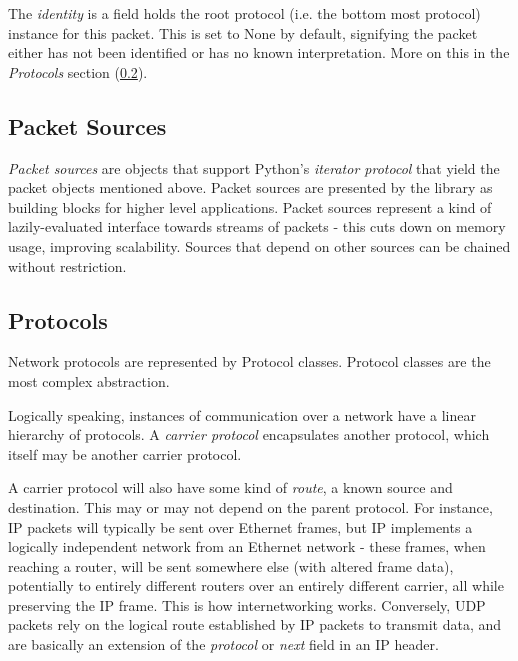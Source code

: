 \documentclass[10pt,a4paper,notitlepage]{report}
\begin{document}
The \emph{identity} is a field holds the root protocol (i.e. the bottom most protocol) instance for this packet. This is set to None by default, signifying the packet either has not been identified or has no known interpretation. More on this in the \emph{Protocols} section (\ref{sec:desproto}).

\subsection{Packet Sources}
\emph{Packet sources} are objects that support Python's \emph{iterator protocol} that yield the packet objects mentioned above. Packet sources are presented by the library as building blocks for higher level applications.
Packet sources represent a kind of lazily-evaluated interface towards streams of packets - this cuts down on memory usage, improving scalability. Sources that depend on other sources can be chained without restriction.

\subsection{Protocols}
\label{sec:desproto}
Network protocols are represented by Protocol classes. Protocol classes are the most complex abstraction.

Logically speaking, instances of communication over a network have a linear hierarchy of protocols. A \emph{carrier protocol} encapsulates another protocol, which itself may be another carrier protocol.

A carrier protocol will also have some kind of \emph{route}, a known source and destination. This may or may not depend  on the parent protocol. For instance, IP packets will typically be sent over Ethernet frames, but IP implements a logically independent network from an Ethernet network - these frames, when reaching a router, will be sent somewhere else (with altered frame data), potentially to entirely different routers over an entirely different carrier, all while preserving the IP frame. This is how internetworking works. Conversely, UDP packets rely on the logical route established by IP packets to transmit data, and are basically an extension of the \emph{protocol} or \emph{next} field in an IP header.
\end{document}
